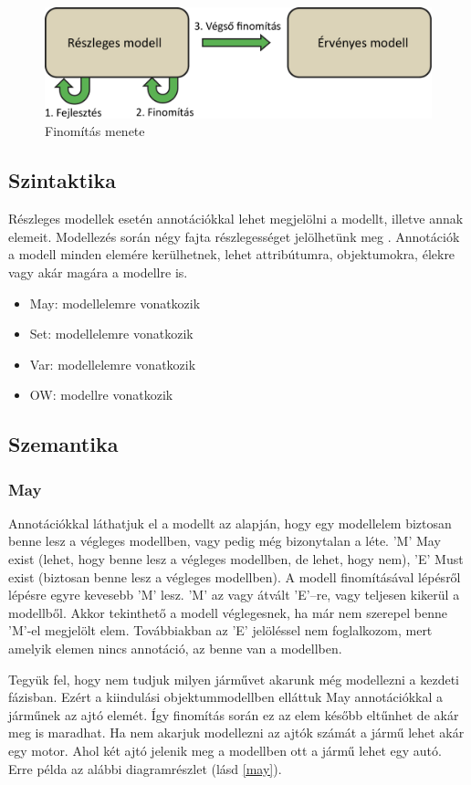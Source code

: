 \begin{figure}[!ht]
	\centering
	\includegraphics[width=130mm]{figures/finom.pdf}
	\caption{Finomítás menete} 
	\label{finomit}
\end{figure}

\subsection{Szintaktika}
Részleges modellek esetén annotációkkal lehet megjelölni a modellt, illetve annak elemeit. Modellezés során négy fajta részlegességet jelölhetünk meg \cite{Salay}. Annotációk a modell minden elemére kerülhetnek, lehet attribútumra, objektumokra, élekre vagy akár magára a modellre is.
\begin{itemize}  
	\item May: modellelemre vonatkozik
	\item Set: modellelemre vonatkozik
	\item Var: modellelemre vonatkozik
	\item OW: modellre vonatkozik
\end{itemize}


\subsection{Szemantika}
\subsubsection{May}
Annotációkkal láthatjuk el a modellt az alapján, hogy egy modellelem biztosan benne lesz a végleges modellben, vagy pedig még bizonytalan a léte. \textsf{’M’} May exist (lehet, hogy benne lesz a végleges modellben, de lehet, hogy nem), \textsf{’E’} Must exist (biztosan benne lesz a végleges modellben). A modell finomításával lépésről lépésre egyre kevesebb ’M’ lesz.  \textsf{’M’} az vagy átvált \textsf{’E’}–re, vagy teljesen kikerül a modellből. Akkor tekinthető a modell véglegesnek, ha már nem szerepel benne \textsf{’M’}-el megjelölt elem. Továbbiakban az \textsf{’E’} jelöléssel nem foglalkozom, mert amelyik elemen nincs annotáció, az benne van a modellben.
\par
Tegyük fel, hogy nem tudjuk milyen járművet akarunk még modellezni a kezdeti fázisban. Ezért a kiindulási objektummodellben elláttuk May annotációkkal a járműnek az ajtó elemét. Így finomítás során ez az elem később eltűnhet de akár meg is maradhat. Ha nem akarjuk modellezni az ajtók számát a jármű lehet akár egy motor. Ahol két ajtó jelenik meg a modellben ott a jármű lehet egy autó. Erre példa az alábbi diagramrészlet (lásd \autoref{may}).

